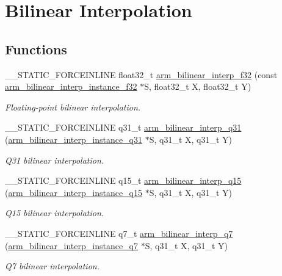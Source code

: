 \hypertarget{group___bilinear_interpolate}{}\section{Bilinear Interpolation}
\label{group___bilinear_interpolate}
\subsection*{Functions}
\begin{DoxyCompactItemize}
\item 
\+\_\+\+\_\+\+S\+T\+A\+T\+I\+C\+\_\+\+F\+O\+R\+C\+E\+I\+N\+L\+I\+NE float32\+\_\+t \mbox{\hyperlink{group___bilinear_interpolate_ga887756dbbe013d0a15b987836a787677}{arm\+\_\+bilinear\+\_\+interp\+\_\+f32}} (const \mbox{\hyperlink{structarm__bilinear__interp__instance__f32}{arm\+\_\+bilinear\+\_\+interp\+\_\+instance\+\_\+f32}} $\ast$S, float32\+\_\+t X, float32\+\_\+t Y)
\begin{DoxyCompactList}\small\item\em Floating-\/point bilinear interpolation. \end{DoxyCompactList}\item 
\+\_\+\+\_\+\+S\+T\+A\+T\+I\+C\+\_\+\+F\+O\+R\+C\+E\+I\+N\+L\+I\+NE q31\+\_\+t \mbox{\hyperlink{group___bilinear_interpolate_gaefe4731017e8b9ac652e5fea57cb1fa5}{arm\+\_\+bilinear\+\_\+interp\+\_\+q31}} (\mbox{\hyperlink{structarm__bilinear__interp__instance__q31}{arm\+\_\+bilinear\+\_\+interp\+\_\+instance\+\_\+q31}} $\ast$S, q31\+\_\+t X, q31\+\_\+t Y)
\begin{DoxyCompactList}\small\item\em Q31 bilinear interpolation. \end{DoxyCompactList}\item 
\+\_\+\+\_\+\+S\+T\+A\+T\+I\+C\+\_\+\+F\+O\+R\+C\+E\+I\+N\+L\+I\+NE q15\+\_\+t \mbox{\hyperlink{group___bilinear_interpolate_ga56fe34273ffb422f428b1d9feeffe0ea}{arm\+\_\+bilinear\+\_\+interp\+\_\+q15}} (\mbox{\hyperlink{structarm__bilinear__interp__instance__q15}{arm\+\_\+bilinear\+\_\+interp\+\_\+instance\+\_\+q15}} $\ast$S, q31\+\_\+t X, q31\+\_\+t Y)
\begin{DoxyCompactList}\small\item\em Q15 bilinear interpolation. \end{DoxyCompactList}\item 
\+\_\+\+\_\+\+S\+T\+A\+T\+I\+C\+\_\+\+F\+O\+R\+C\+E\+I\+N\+L\+I\+NE q7\+\_\+t \mbox{\hyperlink{group___bilinear_interpolate_ga1230bb062f6d8614db10b37ba7c9a161}{arm\+\_\+bilinear\+\_\+interp\+\_\+q7}} (\mbox{\hyperlink{structarm__bilinear__interp__instance__q7}{arm\+\_\+bilinear\+\_\+interp\+\_\+instance\+\_\+q7}} $\ast$S, q31\+\_\+t X, q31\+\_\+t Y)
\begin{DoxyCompactList}\small\item\em Q7 bilinear interpolation. \end{DoxyCompactList}\end{DoxyCompactItemize}


